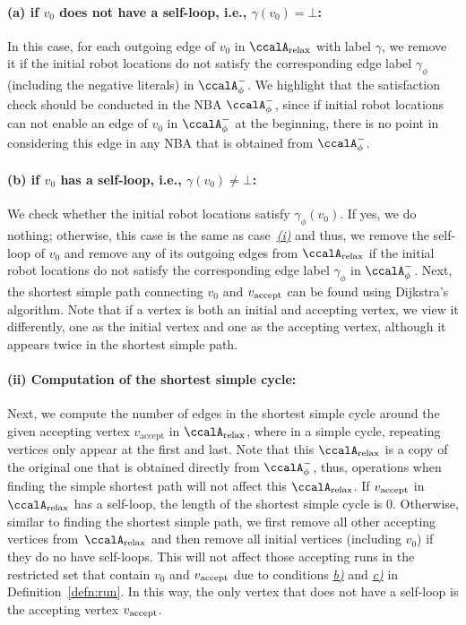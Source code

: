 \documentclass[Afour,sageh,times]{sagej}
\newcommand{\auto}[1]{\ccalA_{\textup{#1}}}
\newcommand{\autop}{\ccalA_{\phi}}
\newcommand{\vertex}[1]{v_{\textup{#1}}}
\begin{document}
{\paragraph{\quad (a) if $v_0$ does not have a self-loop, i.e., $\gamma(v_0)=\bot$:}\label{sec:initial} In this case, for each outgoing edge of $v_0$ in $\auto{relax}$ with label $\gamma$,  we remove it  if the initial robot locations do not satisfy the corresponding edge label $\gamma_\phi$ (including the negative literals) in $\autop^-$. We highlight that the satisfaction check should be conducted in the NBA $\autop^-$, since if initial robot locations can not enable an edge of $v_0$ in $\autop^-$ at the beginning, there is no point in considering this edge in any NBA that is obtained from $\autop^-$.
\paragraph{\quad (b) if $v_0$ has a self-loop, i.e., $\gamma(v_0)\neq\bot$:} We check whether the initial robot locations satisfy $\gamma_\phi(v_0)$. If yes, we do nothing; otherwise, this case is the  same as case~\hyperref[sec:initial]{\it (i)} and thus, we remove the self-loop of $v_0$ and
remove any of its  outgoing edges  from $\auto{relax}$ if the initial robot locations do not satisfy the corresponding edge label $\gamma_\phi$ in $\autop^-$. Next, the shortest simple path connecting $v_0$ and $\vertex{accept}$ can be found using Dijkstra's algorithm.  Note that if a vertex is both an initial and accepting vertex, we view it differently, one as the initial vertex and one as the accepting vertex, although it appears twice in the shortest simple path.
\paragraph{(ii) Computation of the shortest simple cycle:} Next, we compute the number of edges in the shortest simple cycle around the given accepting vertex $v_\text{accept}$ in $\auto{relax}$, where in a simple cycle, repeating vertices only appear at the first and last. Note that this $\auto{relax}$ is a copy of the original one that is obtained directly from $\autop^-$, thus, operations when finding the simple shortest path will not affect this $\auto{relax}$. If $\vertex{accept}$ in $\auto{relax}$ has a self-loop, the length of the shortest simple cycle is 0. Otherwise, similar to finding the shortest simple path, we first remove all other accepting vertices from~$\auto{relax}$ and then remove all initial vertices (including $v_0$) if they do no have self-loops. This will not affect those accepting runs in the restricted set that contain $v_0$ and $\vertex{accept}$  due to conditions \hyperref[cond:b]{\it b)} and \hyperref[cond:c]{\it c)} in Definition~\ref{defn:run}.
  In this way, the only vertex that does not have a self-loop is the accepting vertex $\vertex{accept}$.

}
\end{document}
